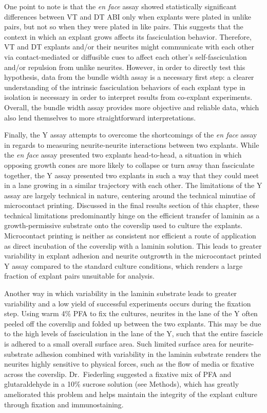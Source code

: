 One point to note is that the \emph{en face} assay showed statistically significant differences between VT and DT ABI only when explants were plated in unlike pairs, but not so when they were plated in like pairs.
This suggests that the context in which an explant grows affects its fasciculation behavior.
Therefore, VT and DT explants and/or their neurites might communicate with each other via contact-mediated or diffusible cues to affect each other's self-fasciculation and/or repulsion from unlike neurites.
However, in order to directly test this hypothesis, data from the bundle width assay is a necessary first step: a clearer understanding of the intrinsic fasciculation behaviors of each explant type in isolation is necessary in order to interpret results from co-explant experiments.
Overall, the bundle width assay provides more objective and reliable data, which also lend themselves to more straightforward interpretations.

Finally, the Y assay attempts to overcome the shortcomings of the \emph{en face} assay in regards to measuring neurite-neurite interactions between two explants.
While the \emph{en face} assay presented two explants head-to-head, a situation in which opposing growth cones are more likely to collapse or turn away than fasciculate together, the Y assay presented two explants in such a way that they could meet in a lane growing in a similar trajectory with each other.
The limitations of the Y assay are largely technical in nature, centering around the technical minutiae of microcontact printing.
Discussed in the final results section of this chapter, these technical limitations predominantly hinge on the efficient transfer of laminin as a growth-permissive substrate onto the coverslip used to culture the explants.
Microcontact printing is neither as consistent nor efficient a route of application as direct incubation of the coverslip with a laminin solution.
This leads to greater variability in explant adhesion and neurite outgrowth in the microcontact printed Y assay compared to the standard culture conditions, which renders a large fraction of explant pairs unsuitable for analysis.

Another way in which variability in the laminin substrate leads to greater variability and a low yield of successful experiments occurs during the fixation step.
Using warm 4\% PFA to fix the cultures, neurites in the lane of the Y often peeled off the coverslip and folded up between the two explants.
This may be due to the high levels of fasciculation in the lane of the Y, such that the entire fascicle is adhered to a small overall surface area.
Such limited surface area for neurite-substrate adhesion combined with variability in the laminin substrate renders the neurites highly sensitive to physical forces, such as the flow of media or fixative across the coverslip.
Dr.~Fiederling suggested a fixative mix of PFA and glutaraldehyde in a 10\% sucrose solution (see Methods), which has greatly ameliorated this problem and helps maintain the integrity of the explant culture through fixation and immunostaining.

